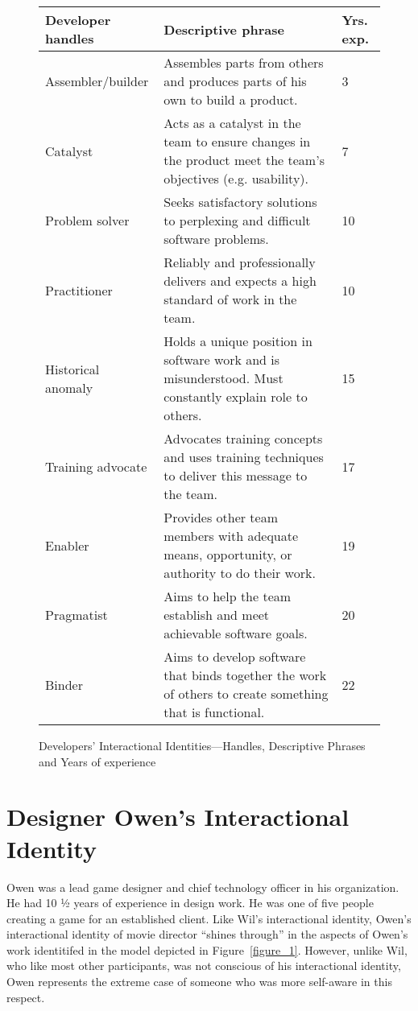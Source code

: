 \documentclass{chi2009}
\begin{document}
\begin{figure}[bt]
\begin{tabular}{p{2.7cm}|p{4.2cm}|p{.5cm}}Developer handles	& Descriptive phrase & Yrs. exp. \\
\hline
Assembler/builder	& Assembles parts from others and produces parts of his own to build a product.  & 3\\
Catalyst	& Acts as a catalyst in the team to ensure changes in the product meet the team's objectives (e.g. usability).  & 7\\
Problem solver	& Seeks satisfactory solutions to perplexing and difficult software problems.  & 10\\
Practitioner	& Reliably and professionally delivers and expects a high standard of work in the team.  & 10\\
Historical anomaly & 	Holds a unique position in software work and is misunderstood. Must constantly explain role to others.  & 15\\
Training advocate & 	Advocates training concepts and uses training techniques to deliver this message to the team.  & 17\\
Enabler & Provides other team members with adequate means, opportunity, or authority to do their work. & 19 \\
Pragmatist	& Aims to help the team establish and meet achievable software goals. & 20\\
Binder 	& Aims to develop software that binds together the work of others to create something that is functional. & 22\\
\end {tabular}
\caption{Developers' Interactional Identities---Handles, Descriptive Phrases and Years of experience}
\label{table_1}
\end{figure}

\section{Designer Owen's Interactional Identity}
Owen was a lead game designer and chief technology officer in his organization. He had 10 ½ years of experience in design work. He was one of five people creating a game for an established client. Like Wil's interactional identity, Owen's interactional identity of movie director ``shines through'' in the aspects of Owen's work identitifed in the model depicted in Figure~\ref{figure_1}.  However, unlike Wil, who like most other participants, was not conscious of his interactional identity, Owen represents the extreme case of someone who was more self-aware in this respect.  
\end{document}
